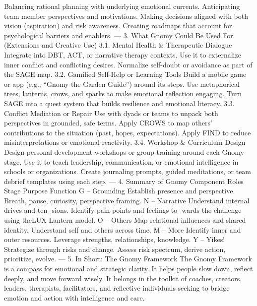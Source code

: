 Balancing rational planning with underlying emotional currents.
Anticipating team member perspectives and motivations.
Making decisions aligned with both vision (aspiration) and risk awareness.
Creating roadmaps that account for psychological barriers and enablers.
—
3.
What Gnomy Could Be Used For
(Extensions and Creative Use)
3.1. Mental Health & Therapeutic Dialogue
Integrate into DBT, ACT, or narrative therapy contexts.
Use it to externalize inner conflict and conflicting desires.
Normalize self-doubt or avoidance as part of the SAGE map.
3.2. Gamified Self-Help or Learning Tools
Build a mobile game or app (e.g., “Gnomy the Garden Guide”) around its steps.
Use metaphorical trees, lanterns, crows, and sparks to make emotional reflection engaging.
Turn SAGE into a quest system that builds resilience and emotional literacy.
3.3. Conflict Mediation or Repair
Use with dyads or teams to unpack both perspectives in grounded, safe terms.
Apply CROWS to map others’ contributions to the situation (past, hopes, expectations).
Apply FIND to reduce misinterpretations or emotional reactivity.
3.4. Workshop & Curriculum Design
Design personal development workshops or group training around each Gnomy stage.
Use it to teach leadership, communication, or emotional intelligence in schools or organizations.
Create journaling prompts, guided meditations, or team debrief templates using each step.
—
4.
Summary of Gnomy Component Roles
Stage Purpose Function
G – Grounding Establish presence and perspective. Breath, pause, curiosity, perspective
framing.
N – Narrative Understand internal drives and ten-
sions.
Identify pain points and feelings to-
wards the challenge using theLUX
Lantern model.
O – Others Map relational influences and shared
identity.
Understand self and others across
time.
M – More Identify inner and outer resources. Leverage strengths, relationships,
knowledge.
Y – Yikes! Strategize through risks and change. Assess risk spectrum, derive action,
prioritize, evolve.
—
5.
In Short: The Gnomy Framework
The Gnomy Framework is a compass for emotional and strategic clarity. It helps people slow down,
reflect deeply, and move forward wisely. It belongs in the toolkit of coaches, creators, leaders, therapists,
facilitators, and reflective individuals seeking to bridge emotion and action with intelligence and care.

